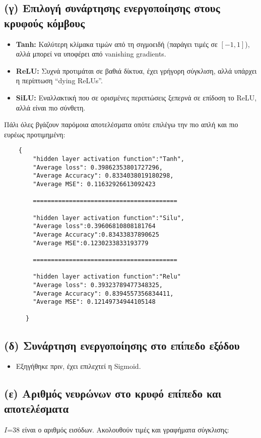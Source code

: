 \documentclass[a4paper,11pt]{article}
\begin{document}
\subsection{(γ) Επιλογή συνάρτησης ενεργοποίησης στους κρυφούς κόμβους}
\begin{itemize}
    \item \textbf{Tanh:} Καλύτερη κλίμακα τιμών από τη σιγμοειδή (παράγει τιμές σε $[-1, 1]$), αλλά μπορεί να υποφέρει από vanishing gradients.
    \item \textbf{ReLU:} Συχνά προτιμάται σε βαθιά δίκτυα, έχει γρήγορη σύγκλιση, αλλά υπάρχει η περίπτωση “dying ReLUs”.
    \item \textbf{SiLU:} Εναλλακτική που σε ορισμένες περιπτώσεις ξεπερνά σε επίδοση το ReLU, αλλά είναι πιο σύνθετη.
\end{itemize}
\noindent
Πάλι όλες βγάζουν παρόμοια αποτελέσματα οπότε επιλέγω την πιο απλή και πιο ευρέως προτιμημένη:
\begin{verbatim}
    {
        "hidden layer activation function":"Tanh",
        "Average loss": 0.39862353801727296,
        "Average Accuracy": 0.8334038019180298,
        "Average MSE": 0.11632926613092423

        ========================================
        
        "hidden layer activation function":"Silu",
        "Average loss":0.39606810808181764
        "Average Accuracy":0.83433837890625
        "Average MSE":0.1230233833193779

        ========================================

        "hidden layer activation function":"Relu"    
        "Average loss": 0.39323789477348325,
        "Average Accuracy": 0.8394557356834411,
        "Average MSE": 0.12149734944105148

      }
    \end{verbatim}


\subsection{(δ) Συνάρτηση ενεργοποίησης στο επίπεδο εξόδου}
\begin{itemize}
    \item Εξηγήθηκε πριν, έχει επιλεχτεί η Sigmoid.
\end{itemize}
\newpage
\subsection{(ε) Αριθμός νευρώνων στο κρυφό επίπεδο και αποτελέσματα}
 $I$=38 είναι ο αριθμός εισόδων. Aκολουθούν τιμές και γραφήματα σύγκλισης:
\end{document}
